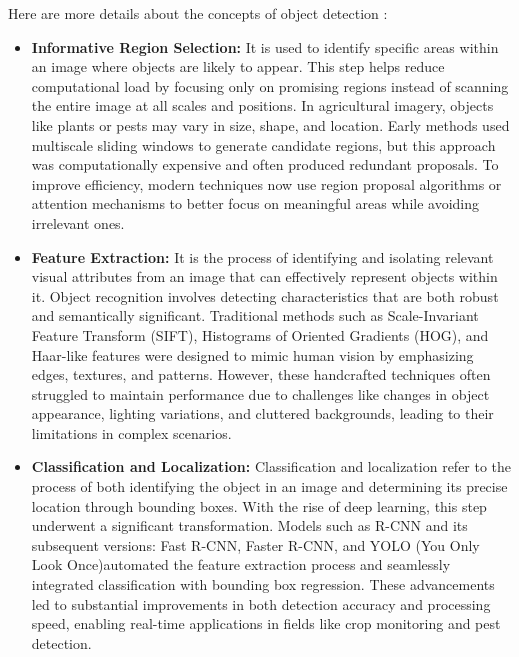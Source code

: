 Here are more details about the concepts of object detection \parencite{zhao2019objectdetection}: 
\begin{itemize}
    \item \textbf{Informative Region Selection:} It is used to identify specific areas within an image where objects are likely to appear. This step helps reduce computational load by focusing only on promising regions instead of scanning the entire image at all scales and positions. In agricultural imagery, objects like plants or pests may vary in size, shape, and location. Early methods used multiscale sliding windows to generate candidate regions, but this approach was computationally expensive and often produced redundant proposals. To improve efficiency, modern techniques now use region proposal algorithms or attention mechanisms to better focus on meaningful areas while avoiding irrelevant ones.
    \item \textbf{Feature Extraction:} It is the process of identifying and isolating relevant visual attributes from an image that can effectively represent objects within it. Object recognition involves detecting characteristics that are both robust and semantically significant. Traditional methods such as Scale-Invariant Feature Transform (SIFT), Histograms of Oriented Gradients (HOG), and Haar-like features were designed to mimic human vision by emphasizing edges, textures, and patterns. However, these handcrafted techniques often struggled to maintain performance due to challenges like changes in object appearance, lighting variations, and cluttered backgrounds, leading to their limitations in complex scenarios.
    \item \textbf{Classification and Localization:} Classification and localization refer to the process of both identifying the object in an image and determining its precise location through bounding boxes. With the rise of deep learning, this step underwent a significant transformation. Models such as R-CNN and its subsequent versions: Fast R-CNN, Faster R-CNN, and YOLO (You Only Look Once)automated the feature extraction process and seamlessly integrated classification with bounding box regression. These advancements led to substantial improvements in both detection accuracy and processing speed, enabling real-time applications in fields like crop monitoring and pest detection.
\end{itemize}

